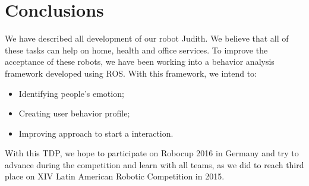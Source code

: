 \section{Conclusions}

We have described all development of our robot Judith. We believe that all of these tasks can help on home, health and office services. To improve the acceptance of these robots, we have been working into a behavior analysis framework developed using ROS. With this framework, we intend to:

\begin{itemize}
    \item Identifying people's emotion;
    \item Creating user behavior profile;
    \item Improving approach to start a interaction.
\end{itemize}

With this TDP, we hope to participate on Robocup 2016 in Germany and try to advance during the competition and learn with all teams, as we did to reach third place on XIV Latin American Robotic Competition in 2015.
